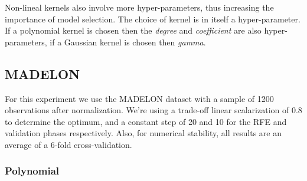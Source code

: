 Non-lineal kernels also involve more hyper-parameters, thus increasing the im\-por\-tance of model selection. The choice of kernel is in itself a hyper-parameter. If a polynomial kernel is chosen then the \emph{degree} and \emph{coefficient} are also hyper-parameters, if a Gaussian kernel is chosen then \emph{gamma}.

\subsection*{MADELON}

For this experiment we use the MADELON dataset with a sample of 1200 ob\-ser\-va\-tions after normalization. We're using a trade-off linear scalarization of 0.8 to determine the optimum, and a constant step of 20 and 10 for the RFE and validation phases respectively. Also, for numerical stability, all results are an average of a 6-fold cross-validation.

\subsubsection*{Polynomial}

